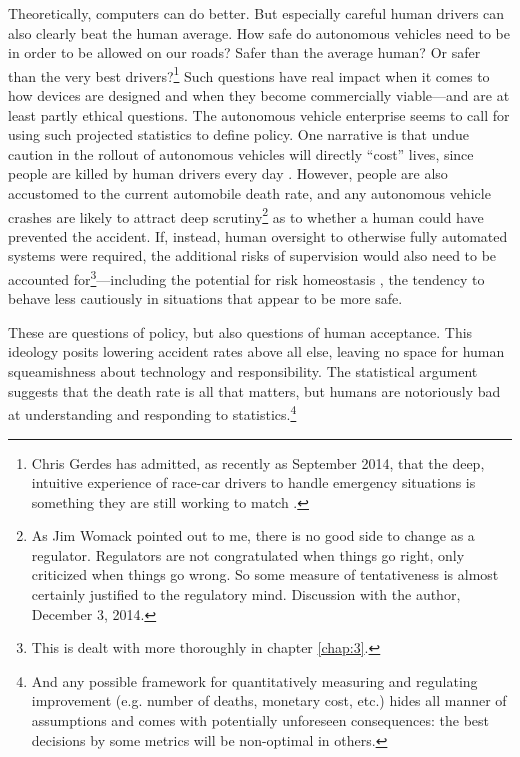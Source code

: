Theoretically, computers can do better. But especially careful human
drivers can also clearly beat the human average. How safe do
autonomous vehicles need to be in order to be allowed on our roads?
Safer than the average human? Or safer than the very best
drivers?\footnote{Chris Gerdes has admitted, as recently as September
  2014, that the deep, intuitive experience of race-car drivers to
  handle emergency situations is something they are still working to
  match \cite{8truthsandmyths}.}
Such questions have real impact when it comes to how devices are
designed and when they become commercially viable---and are at least
partly ethical questions. The autonomous
vehicle enterprise seems to call for using such projected statistics
to define policy. One narrative is that undue caution in the
rollout of autonomous vehicles will directly ``cost'' lives, since
people are killed by human drivers every day \cite{driverlessfuture}. However,
people are also accustomed to the current automobile death rate, and
any autonomous vehicle crashes are likely to attract deep
scrutiny\footnote{As Jim Womack pointed out to me, there is no good side
to change as a regulator. Regulators are not congratulated when things
go right, only criticized when things go wrong. So some measure of
tentativeness is almost certainly justified to the regulatory mind.
Discussion with the author, December 3, 2014.} as
to whether a human could have prevented the accident. If,
instead, human oversight to otherwise fully automated systems were
required, the additional risks of supervision would also need to be
accounted for\footnote{This is dealt with more thoroughly in chapter
\ref{chap:3}.}---including the potential for risk homeostasis
\cite{Wilde}, the tendency to
behave less cautiously in situations that appear to be more safe.

These are questions of policy, but also questions of human acceptance.
This ideology posits lowering accident rates above all else, leaving
no space for human squeamishness about technology and responsibility. 
The statistical argument suggests that the death rate is all that
matters, but humans are notoriously bad at understanding and
responding to statistics.\footnote{And any possible framework for
  quantitatively measuring and regulating improvement (e.g. number of deaths,
  monetary cost, etc.) hides all manner of assumptions and comes with
  potentially unforeseen consequences: the best decisions by some
  metrics will be non-optimal in others.}

